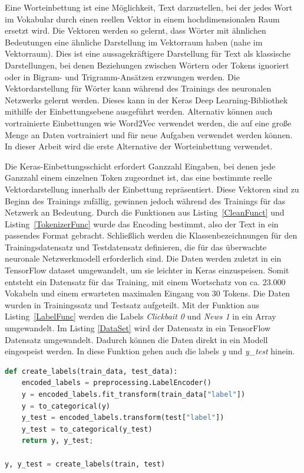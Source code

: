 Eine Worteinbettung ist eine Möglichkeit, Text darzustellen, bei der jedes Wort im Vokabular durch einen reellen Vektor in einem hochdimensionalen Raum ersetzt wird. Die Vektoren werden so gelernt, dass Wörter mit ähnlichen Bedeutungen eine ähnliche Darstellung im Vektorraum haben (nahe im Vektorraum). Dies ist eine aussagekräftigere Darstellung für Text als klassische Darstellungen, bei denen Beziehungen zwischen Wörtern oder Tokens ignoriert oder in Bigram- und Trigramm-Ansätzen erzwungen werden. Die Vektordarstellung für Wörter kann während des Trainings des neuronalen Netzwerks gelernt werden. Dieses kann in der Keras Deep Learning-Bibliothek mithilfe der Einbettungsebene ausgeführt werden. Alternativ können auch vortrainierte Einbettungen wie Word2Vec verwendet werden, die auf eine große Menge an Daten vortrainiert und für neue Aufgaben verwendet werden können. In dieser Arbeit wird die erste Alternative der Worteinbettung verwendet.


Die Keras-Einbettungsschicht erfordert Ganzzahl Eingaben, bei denen jede Ganzzahl einem einzelnen Token zugeordnet ist, das eine bestimmte reelle Vektordarstellung innerhalb der Einbettung repräsentiert. Diese Vektoren sind zu Beginn des Trainings zufällig, gewinnen jedoch während des Trainings für das Netzwerk an Bedeutung. Durch die Funktionen aus Listing~\ref{CleanFunct} und Listing~\ref{TokenizerFunc} wurde das Encoding bestimmt, also der Text in ein passendes Format gebracht. Schließlich werden die Klassenbezeichnungen für den Trainingsdatensatz und Testdatensatz definieren, die für das überwachte neuronale Netzwerkmodell erforderlich sind. Die Daten werden zuletzt in ein TensorFlow dataset umgewandelt, um sie leichter in Keras einzuspeisen. Somit entsteht ein Datensatz für das Training, mit einem Wortschatz  von ca. 23.000 Vokabeln und einem erwarteten maximalen Eingang von 30 Tokens. Die Daten wurden in Trainingssatz und Testsatz aufgeteilt. Mit der Funktion aus Listing~\ref{LabelFunc} werden die Labels \textit{Clickbait 0} und  \textit{News 1} in ein Array umgewandelt. Im Listing \ref{DataSet} wird der Datensatz in ein TensorFlow Datensatz umgewandelt. Dadurch können die Daten direkt in ein Modell eingespeist werden. In diese Funktion gehen auch die labels \textit{y} und \textit{y\_test} hinein. 

\begin{lstlisting}[language=Python,caption=Die Label-Funktion, label={LabelFunc}]
def create_labels(train_data, test_data):
    encoded_labels = preprocessing.LabelEncoder()
    y = encoded_labels.fit_transform(train_data["label"])
    y = to_categorical(y)
    y_test = encoded_labels.transform(test["label"])
    y_test = to_categorical(y_test)
    return y, y_test;

y, y_test = create_labels(train, test)
\end{lstlisting}

